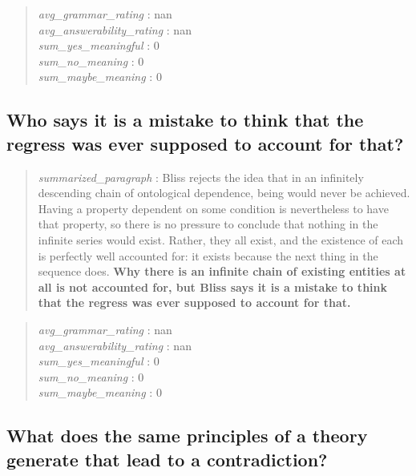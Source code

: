 \begin{quote}
\emph{avg\_grammar\_rating} : nan\\
\emph{avg\_answerability\_rating} : nan\\
\emph{sum\_yes\_meaningful} : 0\\
\emph{sum\_no\_meaning} : 0\\
\emph{sum\_maybe\_meaning} : 0
\end{quote}

\hypertarget{who-says-it-is-a-mistake-to-think-that-the-regress-was-ever-supposed-to-account-for-that}{%
\subsection{Who says it is a mistake to think that the regress was ever
supposed to account for
that?}\label{who-says-it-is-a-mistake-to-think-that-the-regress-was-ever-supposed-to-account-for-that}}

\begin{quote}
\emph{summarized\_paragraph} : Bliss rejects the idea that in an
infinitely descending chain of ontological dependence, being would never
be achieved. Having a property dependent on some condition is
nevertheless to have that property, so there is no pressure to conclude
that nothing in the infinite series would exist. Rather, they all exist,
and the existence of each is perfectly well accounted for: it exists
because the next thing in the sequence does. \textbf{Why there is an
infinite chain of existing entities at all is not accounted for, but
Bliss says it is a mistake to think that the regress was ever supposed
to account for that.}
\end{quote}

\begin{quote}
\emph{avg\_grammar\_rating} : nan\\
\emph{avg\_answerability\_rating} : nan\\
\emph{sum\_yes\_meaningful} : 0\\
\emph{sum\_no\_meaning} : 0\\
\emph{sum\_maybe\_meaning} : 0
\end{quote}

\hypertarget{what-does-the-same-principles-of-a-theory-generate-that-lead-to-a-contradiction}{%
\subsection{What does the same principles of a theory generate that lead
to a
contradiction?}\label{what-does-the-same-principles-of-a-theory-generate-that-lead-to-a-contradiction}}

